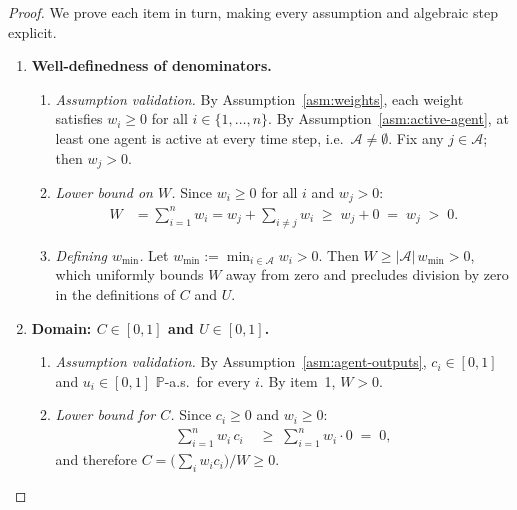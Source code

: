 \documentclass[12pt,openany]{book}
\newcommand{\Prob}{\mathbb{P}}
\numberwithin{equation}{chapter}
\theoremstyle{plain}
\theoremstyle{definition}
\theoremstyle{remark}
\numberwithin{equation}{chapter}
\theoremstyle{plain}
\begin{document}
\begin{proof}
We prove each item in turn, making every assumption and
algebraic step explicit.

\begin{enumerate}

  \item \textbf{Well-definedness of denominators.}

  \begin{enumerate}
    \item \emph{Assumption validation.}
      By Assumption~\ref{asm:weights}, each weight satisfies
      $w_i \geq 0$ for all $i \in \{1,\ldots,n\}$.
      By Assumption~\ref{asm:active-agent}, at least one
      agent is active at every time step, i.e.\
      $\mathcal{A} \neq \emptyset$.  Fix any
      $j \in \mathcal{A}$; then $w_j > 0$.

    \item \emph{Lower bound on $W$.}
      Since $w_i \geq 0$ for all $i$ and $w_j > 0$:
      \begin{align}
        W
          &= \sum_{i=1}^{n} w_i
           = w_j + \sum_{i \neq j} w_i
           \;\geq\;
           w_j + 0
           \;=\; w_j
           \;>\; 0.
      \end{align}

    \item \emph{Defining $w_{\min}$.}
      Let $w_{\min} := \min_{i \in \mathcal{A}} w_i > 0$.
      Then $W \geq |\mathcal{A}|\, w_{\min} > 0$, which
      uniformly bounds $W$ away from zero and precludes
      division by zero in the definitions of $C$ and $U$.
  \end{enumerate}

  \item \textbf{Domain: $C \in [0,1]$ and $U \in [0,1]$.}

  \begin{enumerate}
    \item \emph{Assumption validation.}
      By Assumption~\ref{asm:agent-outputs},
      $c_i \in [0,1]$ and $u_i \in [0,1]$
      $\Prob$-a.s.\ for every $i$.  By item~1,
      $W > 0$.

    \item \emph{Lower bound for $C$.}
      Since $c_i \geq 0$ and $w_i \geq 0$:
      \begin{align}
        \sum_{i=1}^{n} w_i\, c_i
          &\;\geq\;
           \sum_{i=1}^{n} w_i \cdot 0
           \;=\; 0,
      \end{align}
      and therefore $C = \bigl(\sum_i w_i c_i\bigr)/W \geq 0$.


\end{enumerate}
\end{enumerate}
\end{proof}
\end{document}
